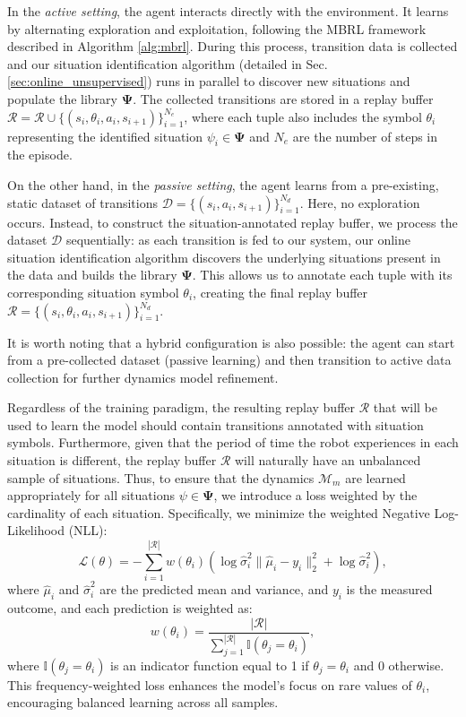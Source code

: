 \documentclass[Afour,sageh,times]{sagej}
\theoremstyle{lemma}
\begin{document}
In the \textit{active setting}, the agent interacts directly with the environment. It learns by alternating exploration and exploitation, following the MBRL framework described in Algorithm \ref{alg:mbrl}. During this process, transition data is collected and our situation identification algorithm (detailed in Sec. \ref{sec:online_unsupervised}) runs in parallel to discover new situations and populate the library $\boldsymbol{\Psi}$. The collected transitions are stored in a replay buffer $\mathcal{R} = \mathcal{R} \cup \{(s_i, \theta_i, a_i, s_{i+1})\}_{i=1}^{N_e}$, where each tuple also includes the symbol $\theta_i$ representing the identified situation $\psi_i \in \boldsymbol{\Psi}$ and $N_e$ are the number of steps in the episode.

On the other hand, in the \textit{passive setting}, the agent learns from a pre-existing, static dataset of transitions $\mathcal{D} = \{(s_i, a_i, s_{i+1})\}_{i=1}^{N_d}$. Here, no exploration occurs. Instead, to construct the situation-annotated replay buffer, we process the dataset $\mathcal{D}$ sequentially: as each transition is fed to our system, our online situation identification algorithm discovers the underlying situations present in the data and builds the library $\boldsymbol{\Psi}$. This allows us to annotate each tuple with its corresponding situation symbol $\theta_i$, creating the final replay buffer $\mathcal{R} = \{(s_i, \theta_i, a_i, s_{i+1})\}_{i=1}^{N_d}$.

It is worth noting that a hybrid configuration is also possible: the agent can start from a pre-collected dataset (passive learning) and then transition to active data collection for further dynamics model refinement.

Regardless of the training paradigm, the resulting replay buffer $\mathcal{R}$ that will be used to learn the model should contain transitions annotated with situation symbols. Furthermore, given that the period of time the robot experiences in each situation is different, the replay buffer $\mathcal{R}$ will naturally have an unbalanced sample of situations. Thus, to ensure that the dynamics $\mathcal{M}_m$ are learned appropriately for all situations $\psi \in \boldsymbol{\Psi}$, we introduce a loss weighted by the cardinality of each situation. Specifically, we minimize the weighted Negative Log-Likelihood (NLL):
\begin{equation} \label{eq:loss-function}
    \mathcal{L}(\theta) = - \sum_{i=1}^{|\mathcal{R}|} w(\theta_i) \left( \log \hat{\sigma}_i^2 \| \hat{\mu}_i - y_i \|_2^2 + \log \hat{\sigma}_i^2 \right),
\end{equation} 
where $\hat{\mu}_i$ and $\hat{\sigma}_i^2$ are the predicted mean and variance, and $y_i$ is the measured outcome, and each prediction is weighted as: 
\begin{equation}
    w(\theta_i) = \frac{|\mathcal{R}|}{\sum_{j=1}^{|\mathcal{R}|} \mathbb{I}(\theta_j = \theta_i)},
\end{equation}
where \(\mathbb{I}(\theta_j = \theta_i)\) is an indicator function equal to 1 if \(\theta_j = \theta_i\) and 0 otherwise. This frequency-weighted loss enhances the model’s focus on rare values of \(\theta_i\), encouraging balanced learning across all samples.
\end{document}
